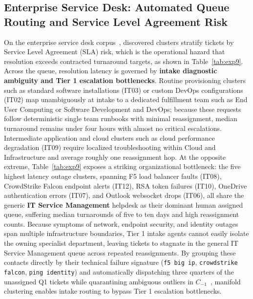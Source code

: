 \documentclass[sigconf,anonymous,pbalance]{acmart}
\begin{document}
\subsection{Enterprise Service Desk: Automated Queue Routing and Service Level Agreement Risk}
On the enterprise service desk corpus~\cite{agarwal2012identifying, vogel2024itsm}, discovered clusters stratify tickets by Service Level Agreement (SLA) risk, which is the operational hazard that resolution exceeds contracted turnaround targets, as shown in Table~\ref{tab:exp9}. Across the queue, resolution latency is governed by \textbf{intake diagnostic ambiguity and Tier 1 escalation bottlenecks}. Routine provisioning clusters such as standard software installations (IT03) or custom DevOps configurations (IT02) map unambiguously at intake to a dedicated fulfillment team such as End User Computing or Software Development and DevOps; because these requests follow deterministic single team runbooks with minimal reassignment, median turnaround remains under four hours with almost no critical escalations. Intermediate application and cloud clusters such as cloud performance degradation (IT09) require localized troubleshooting within Cloud and Infrastructure and average roughly one reassignment hop. At the opposite extreme, Table~\ref{tab:exp9} exposes a striking organizational bottleneck: the five highest latency outage clusters, spanning F5 load balancer faults (IT08), CrowdStrike Falcon endpoint alerts (IT12), RSA token failures (IT10), OneDrive authentication errors (IT07), and Outlook websocket drops (IT06), all share the generic \textbf{IT Service Management} helpdesk as their dominant human assigned queue, suffering median turnarounds of five to ten days and high reassignment counts. Because symptoms of network, endpoint security, and identity outages span multiple infrastructure boundaries, Tier 1 intake agents cannot easily isolate the owning specialist department, leaving tickets to stagnate in the general IT Service Management queue across repeated reassignments. By grouping these contacts directly by their technical failure signature (\texttt{f5 big ip}, \texttt{crowdstrike falcon}, \texttt{ping identity}) and automatically dispatching three quarters of the unassigned Q1 tickets while quarantining ambiguous outliers in $C_{-1}$~\cite{chen2020incidental}, manifold clustering enables intake routing to bypass Tier 1 escalation bottlenecks.
\end{document}

